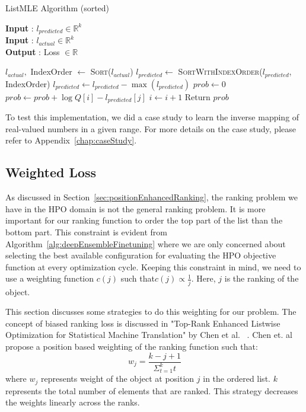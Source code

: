 \documentclass[12pt, twoside, ngerman]{report}
\begin{document}
\begin{algorithm}[h]
\caption{ListMLE Algorithm (sorted)}
\label{alg:listMLESorted}
\hspace*{\algorithmicindent} \textbf{Input} : $l_{predicted} \in \mathbb{R}^k$ \\
\hspace*{\algorithmicindent} \textbf{Input} : $l_{actual} \in \mathbb{R}^k$ \\
\hspace*{\algorithmicindent} \textbf{Output} : Loss $\in \mathbb{R}$
\begin{algorithmic}[1]
\State $l_{actual}, $ IndexOrder $\gets$ \textsc{Sort}($l_{actual}$)
\State $l_{predicted} \gets$ \textsc{SortWithIndexOrder}($l_{predicted}$,  IndexOrder)
\State $l_{predicted} \gets l_{predicted} - \max(l_{predicted})$ 
\State $prob \gets 0$    
        \State $prob \gets prob + \log Q[i] - l_{predicted}[j]$
        \State $i \gets i + 1$
    \EndFor
\State Return $prob$
\EndProcedure
\end{algorithmic}
\end{algorithm}

To test this implementation, we did a case study to learn the inverse mapping of real-valued numbers in a given range.
For more details on the case study, please refer to Appendix~\ref{chap:caseStudy}.

\subsection{Weighted Loss}
As discussed in Section~\ref{sec:positionEnhancedRanking},  the ranking problem we have in the HPO domain is not the general ranking problem.
It is more important for our ranking function to order the top part of the list than the bottom part.
This constraint is evident from Algorithm~\ref{alg:deepEnsembleFinetuning} where we are only concerned about selecting the best available configuration for evaluating the HPO objective function at every optimization cycle.
Keeping this constraint in mind,  we need to use a weighting function $c(j)$ such that$ c(j) \propto \frac{1}{j} $.
Here, $j$ is the ranking of the object.

This section discusses some strategies to do this weighting for our problem.
The concept of biased ranking loss is discussed in "Top-Rank Enhanced Listwise Optimization for Statistical Machine Translation" by  Chen et al. ~\cite{TRLWO}.
Chen et. al propose a position based weighting of the ranking function such that:
\begin{equation}
w_j = \frac{k - j + 1}{\Sigma_{t=1}^k t}
\end{equation}
where $w_j$ represents weight of the object at position $j$ in the ordered list.
$k$ represents the total number of elements that are ranked.
This strategy decreases the weights linearly across the ranks.
\end{document}

